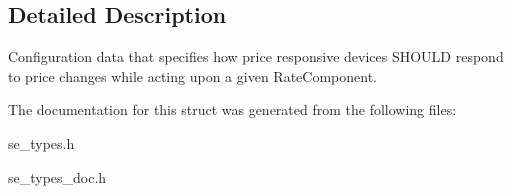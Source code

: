 \subsection{Detailed Description}
Configuration data that specifies how price responsive devices S\+H\+O\+U\+LD respond to price changes while acting upon a given Rate\+Component. 

The documentation for this struct was generated from the following files\+:\begin{DoxyCompactItemize}
\item 
se\+\_\+types.\+h\item 
se\+\_\+types\+\_\+doc.\+h\end{DoxyCompactItemize}
